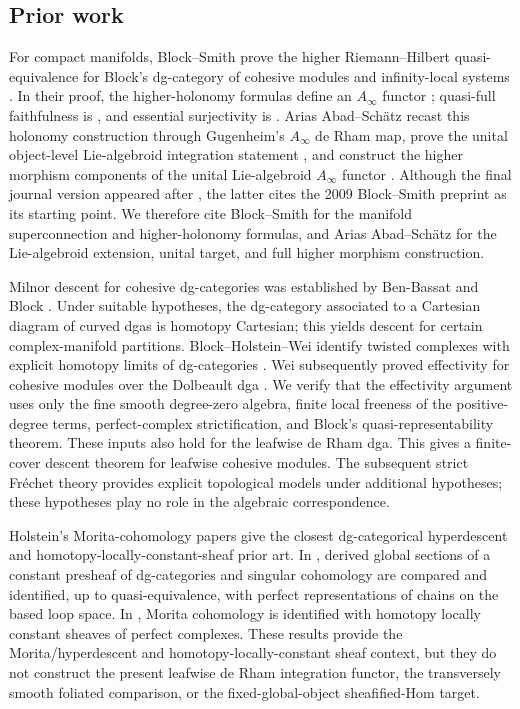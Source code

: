 \documentclass[12pt]{amsart}
\theoremstyle{definition}
\theoremstyle{remark}
\numberwithin{equation}{section}
\newcommand{\1}{{\mathbb{1}}}
\begin{document}
\subsection{Prior work}

For compact manifolds, Block--Smith prove the higher
Riemann--Hilbert quasi-equivalence for Block's dg-category of cohesive
modules and infinity-local systems \cite[Theorem 4.1]{BS14}.  In their proof, the
higher-holonomy formulas define an $A_\infty$ functor
\cite[Theorem 4.2]{BS14}; quasi-full faithfulness is
\cite[Proposition 4.3]{BS14}, and essential surjectivity is
\cite[Theorem 4.5]{BS14}.  Arias Abad--Sch\"atz recast this holonomy
construction through Gugenheim's $A_\infty$ de Rham map, prove the
unital object-level Lie-algebroid integration statement
\cite[Theorem 4.13]{AS12}, and construct the higher morphism
components of the unital Lie-algebroid $A_\infty$ functor
\cite[Definition 4.16 and Theorem 4.18]{AS12}.  Although the final
journal version \cite{BS14} appeared after \cite{AS12}, the latter
cites the 2009 Block--Smith preprint as its starting point.  We
therefore cite Block--Smith for the manifold superconnection and
higher-holonomy formulas, and Arias Abad--Sch\"atz for the
Lie-algebroid extension, unital target, and full higher morphism
construction.

Milnor descent for cohesive dg-categories was established by
Ben-Bassat and Block \cite{BenBasBlock13}.  Under suitable hypotheses,
the dg-category associated to a Cartesian diagram of curved dgas is
homotopy Cartesian; this yields descent for certain complex-manifold
partitions.
Block--Holstein--Wei identify twisted complexes with explicit
homotopy limits of dg-categories \cite[Theorem 4.1]{BHW17}.  Wei
subsequently proved effectivity for cohesive modules over the
Dolbeault dga \cite[Theorem 1.1]{Wei23}.  We verify that the
effectivity argument uses only the fine smooth degree-zero algebra,
finite local freeness of the positive-degree terms, perfect-complex
strictification, and Block's quasi-representability theorem.  These
inputs also hold for the leafwise de Rham dga.  This gives a
finite-cover descent theorem for leafwise cohesive modules.  The
subsequent strict Fr\'echet theory provides explicit topological
models under additional hypotheses; these hypotheses play no role in
the algebraic correspondence.

Holstein's Morita-cohomology papers give the closest dg-categorical
hyperdescent and homotopy-locally-constant-sheaf prior art.  In
\cite{Hol15Morita}, derived global sections of a constant presheaf of
dg-categories and singular cohomology are compared and identified, up
to quasi-equivalence, with perfect representations of chains on the
based loop space.  In \cite{Hol15HLC}, Morita cohomology is identified
with homotopy locally constant sheaves of perfect complexes.  These
results provide the Morita/hyperdescent and homotopy-locally-constant
sheaf context, but they do not construct the present leafwise de Rham
integration functor, the transversely smooth foliated comparison, or
the fixed-global-object sheafified-Hom target.
\end{document}
